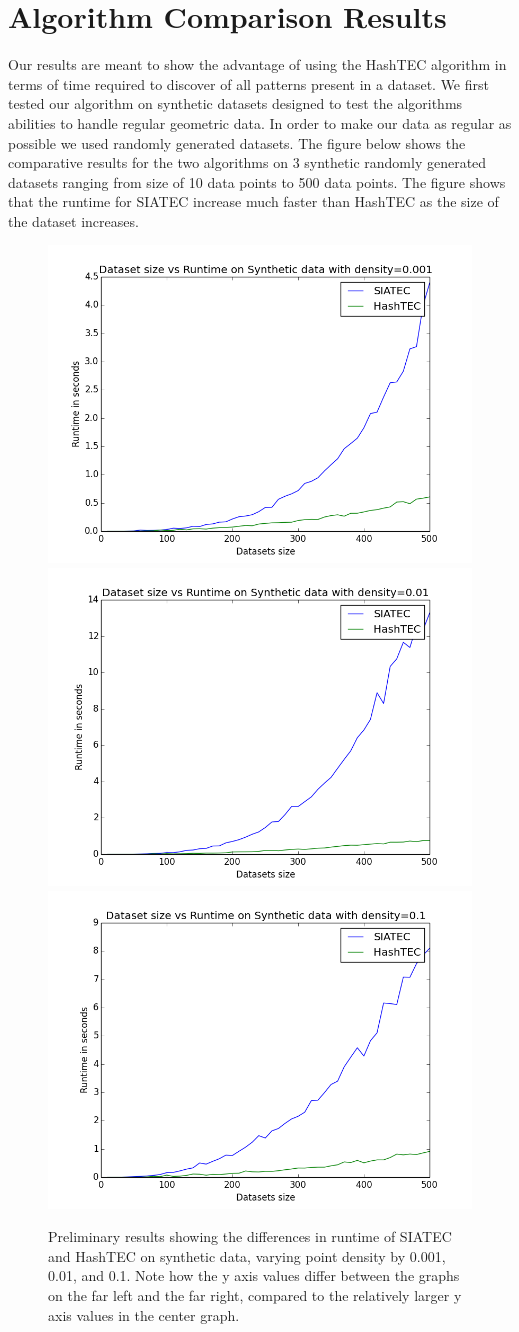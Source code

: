 \documentclass[12pt]{article}
\begin{document}
\section{Algorithm Comparison Results}
Our results are meant to show the advantage of using the HashTEC algorithm in terms of time required to discover of all patterns present in a dataset. We first tested our algorithm on synthetic datasets designed to test the algorithms abilities to handle regular geometric data. In order to make our data as regular as possible we used randomly generated datasets. The figure below shows the comparative results for the two algorithms on 3 synthetic randomly generated datasets ranging from size of 10 data points to 500 data points. The figure shows that the runtime for SIATEC increase much faster than HashTEC as the size of the dataset increases.
\FloatBarrier
\begin{figure}[!htbp]
  \centering
  \includegraphics[width=.3\textwidth]{prelim_results_0}
  \includegraphics[width=.3\textwidth]{prelim_results_1}
  \includegraphics[width=.3\textwidth]{prelim_results_2}
  \label{fig:figure4}
  \caption{Preliminary results showing the differences in runtime of SIATEC and HashTEC on synthetic data, varying point density by 0.001, 0.01, and 0.1. Note how the y axis values differ between the graphs on the far left and the far right, compared to the relatively larger y axis values in the center graph.}
\end{figure}
\FloatBarrier
\end{document}
